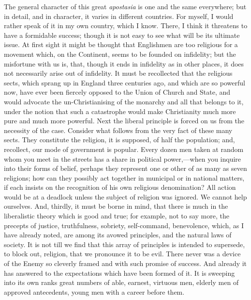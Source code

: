 The general character of this great \emph{apostasia} is one and the
same everywhere; but in detail, and in character, it varies in
different countries. For myself, I would rather speak of it in my own
country, which I know. There, I think it threatens to have a
formidable success; though it is not easy to see what will be its
ultimate issue. At first sight it might be thought that Englishmen are
too religious for a movement which, on the Continent, seems to be
founded on infidelity; but the misfortune with us is, that, though it
ends in infidelity as in other places, it does not necessarily arise
out of infidelity. It must be recollected that the religious sects,
which sprang up in England three centuries ago, and which are so
powerful now, have ever been fiercely opposed to the Union of Church
and State, and would advocate the un-Christianising of the monarchy
and all that belongs to it, under the notion that such a catastrophe
would make Christianity much more pure and much more powerful. Next
the liberal principle is forced on us from the necessity of the case.
Consider what follows from the very fact of these many sects.
They constitute the religion, it is supposed, of half the population;
and, recollect, our mode of government is popular. Every dozen men
taken at random whom you meet in the streets has a share in political
power,—when you inquire into their forms of belief, perhaps they
represent one or other of as many as seven religions; how can they
possibly act together in municipal or in national matters, if each
insists on the recognition of his own religious denomination? All
action would be at a deadlock unless the subject of religion was
ignored. We cannot help ourselves. And, thirdly, it must be borne in
mind, that there is much in the liberalistic theory which is good and
true; for example, not to say more, the precepts of justice,
truthfulness, sobriety, self-command, benevolence, which, as I have
already noted, are among its avowed principles, and the natural laws
of society. It is not till we find that this array of principles is
intended to supersede, to block out, religion, that we pronounce it to
be evil. There never was a device of the Enemy so cleverly framed and
with such promise of success. And already it has answered to the
expectations which have been formed of it. It is sweeping into its own
ranks great numbers of able, earnest, virtuous men, elderly men of
approved antecedents, young men with a career before them.

